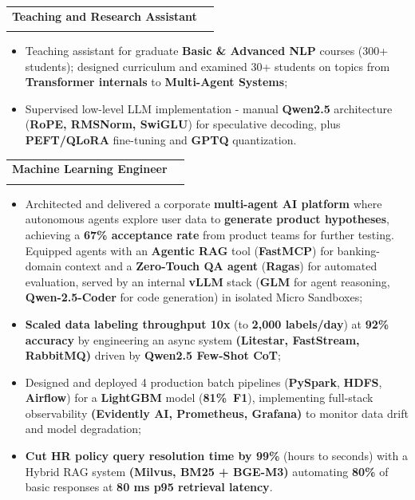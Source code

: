 \documentclass[letterpaper,11pt]{article}
\makeatletter
\newcommand{\resumeItem}[1]{
  \item\small{#1}
}
\newcommand{\resumeSubheading}[4]{
  \vspace{-3pt}\item
    \begin{tabular*}{0.97\textwidth}[t]{l@{\extracolsep{\fill}}r}
      \textbf{#1} & \normalfont{#2} \\[1pt]
      \normalfont{#3} & \textit{#4} \\
    \end{tabular*}\vspace{-3pt}
}
\newcommand{\resumeItemListStart}{\begin{itemize}}
\newcommand{\resumeItemListEnd}{\end{itemize}}
\makeatother
\begin{document}
\resumeSubheading
      {Teaching and Research Assistant}{Sep 2025 -- Present}
      {Higher School of Economics (HSE University)}{}
      \resumeItemListStart
        \resumeItem{Teaching assistant for graduate \textbf{Basic \& Advanced NLP} courses (300+ students); designed curriculum and examined 30+ students on topics from \textbf{Transformer internals} to \textbf{Multi-Agent Systems};}
        \resumeItem{Supervised low-level LLM implementation - manual \textbf{Qwen2.5} architecture (\textbf{RoPE, RMSNorm, SwiGLU}) for speculative decoding, plus \textbf{PEFT/QLoRA} fine-tuning and \textbf{GPTQ} quantization.}
      \resumeItemListEnd

    \resumeSubheading
      {Machine Learning Engineer}{Jun 2024 -- May 2026}
      {Raiffeisenbank}{}
\resumeItemListStart
        \resumeItem{Architected and delivered a corporate \textbf{multi-agent AI platform} where autonomous agents explore user data to \textbf{generate product hypotheses}, achieving a \textbf{67\% acceptance rate} from product teams for further testing. Equipped agents with an \textbf{Agentic RAG} tool (\textbf{FastMCP}) for banking-domain context and a \textbf{Zero-Touch QA agent} (\textbf{Ragas}) for automated evaluation, served by an internal \textbf{vLLM} stack (\textbf{GLM} for agent reasoning, \textbf{Qwen-2.5-Coder} for code generation) in isolated Micro Sandboxes;}
        
        \resumeItem{\textbf{Scaled data labeling throughput 10x} (to \textbf{2,000 labels/day}) at \textbf{92\% accuracy} by engineering an async system \textbf{(Litestar, FastStream, RabbitMQ)} driven by \textbf{Qwen2.5 Few-Shot CoT};}
        
        \resumeItem{
Designed and deployed 4 production batch pipelines (\textbf{PySpark}, \textbf{HDFS}, \textbf{Airflow}) for a \textbf{LightGBM} model (\textbf{81\%~F1}), implementing full-stack observability \textbf{(Evidently AI, Prometheus, Grafana)} to monitor data drift and model degradation;}


        
        \resumeItem{\textbf{Cut HR policy query resolution time by 99\%} (hours to seconds) with a Hybrid RAG system \textbf{(Milvus, BM25 + BGE-M3)} automating \textbf{80\%} of basic responses at \textbf{80 ms p95 retrieval latency}.}
        \resumeItemListEnd
\end{document}
